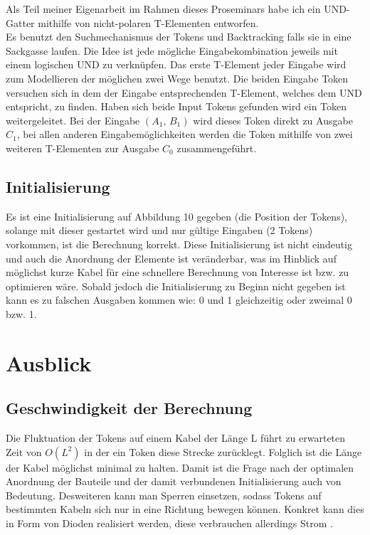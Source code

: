 \documentclass[11pt,a4paper]{article}
\begin{document}
Als Teil meiner Eigenarbeit im Rahmen dieses Proseminars habe ich ein UND-Gatter
mithilfe von nicht-polaren T-Elementen entworfen. \\
%
Es benutzt den Suchmechanismus der Tokens und Backtracking falls sie in eine 
Sackgasse laufen. 
%
Die Idee ist jede mögliche Eingabekombination jeweils mit einem 
logischen UND zu verknüpfen. 
%
Das erste T-Element jeder Eingabe wird zum Modellieren
der möglichen zwei Wege benutzt.
%
Die beiden Eingabe Token versuchen sich in dem der Eingabe entsprechenden
T-Element, welches dem UND entspricht, zu finden.
%
Haben sich beide Input Tokens gefunden wird ein Token weitergeleitet.
Bei der Eingabe $ (A_{1},\, B_{1}) $ wird dieses Token direkt zu Ausgabe
$ C_{1} $, bei allen anderen Eingabemöglichkeiten werden die Token mithilfe
von zwei weiteren T-Elementen zur Ausgabe $ C_{0} $ zusammengeführt. 


\subsection{Initialisierung}
Es ist eine Initialisierung auf Abbildung 10 gegeben (die Position der Tokens), 
solange mit dieser gestartet wird und nur gültige Eingaben (2 Tokens) 
vorkommen, ist die Berechnung korrekt.
%
Diese Initialisierung ist nicht eindeutig und auch die Anordnung der
Elemente ist veränderbar, was im Hinblick auf möglichst kurze Kabel 
für eine schnellere Berechnung von Interesse ist bzw. zu optimieren wäre.
%
Sobald jedoch die Initialisierung zu Beginn nicht gegeben ist kann es zu 
falschen Ausgaben kommen wie: 0 und 1 gleichzeitig oder zweimal 0 bzw. 1. 



\section{Ausblick}
\subsection{Geschwindigkeit der Berechnung}
Die Fluktuation der Tokens auf einem Kabel der Länge L führt zu 
erwarteten Zeit von $ O(L^2) $ in der ein Token diese Strecke zurücklegt.
%
Folglich ist die Länge der Kabel möglichst minimal zu halten. 
%
Damit ist die Frage nach der optimalen Anordnung der Bauteile und der damit 
verbundenen Initialisierung auch von Bedeutung.
%
Desweiteren kann man Sperren einsetzen, sodass Tokens
auf bestimmten Kabeln sich nur in eine Richtung bewegen können. 
%
Konkret kann dies in Form von Dioden realisiert werden, diese verbrauchen
allerdings Strom \cite{Peper_Fundamentals_2013}.
%
\end{document}
